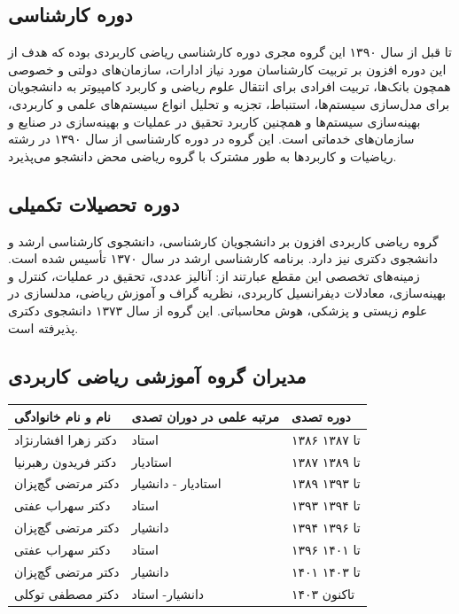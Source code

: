 \documentclass[
  letterpaper,
  DIV=11,
  numbers=noendperiod]{scrreprt}
\newcounter{none} %
\begin{document}
\subsection{دوره
کارشناسی}\label{ux62fux648ux631ux647-ux6a9ux627ux631ux634ux646ux627ux633ux6cc}

تا قبل از سال ۱۳۹۰ این گروه مجری دوره کارشناسی ریاضی کاربردی بوده که هدف
از این دوره افزون بر تربیت کارشناسان مورد نیاز ادارات، سازمان‌های دولتی و
خصوصی همچون بانک‌ها، تربیت افرادی برای انتقال علوم ریاضی و کاربرد
کامپیوتر به دانشجویان برای مدل‌سازی سیستم‌ها، استنباط، تجزیه و تحلیل انواع
سیستم‌های علمی و کاربردی، بهینه‌سازی سیستم‌ها و همچنین کاربرد تحقیق در
عملیات و بهینه‌سازی در صنایع و سازمان‌های خدماتی است. این گروه در دوره
کارشناسی از سال ۱۳۹۰ در رشته ریاضیات و کاربردها به طور مشترک با گروه
ریاضی محض دانشجو می‌پذیرد.

\subsection{دوره تحصیلات
تکمیلی}\label{ux62fux648ux631ux647-ux62aux62dux635ux6ccux644ux627ux62a-ux62aux6a9ux645ux6ccux644ux6cc}

گروه ریاضی کاربردی افزون بر دانشجویان کارشناسی، دانشجوی کارشناسی ارشد و
دانشجوی دکتری نیز دارد. برنامه کارشناسی ارشد در سال ۱۳۷۰ تأسیس شده است.
زمینه‌های تخصصی این مقطع عبارتند از: آنالیز عددی، تحقیق در عملیات، کنترل
و بهینه‌سازی، معادلات دیفرانسیل کاربردی، نظریه گراف و آموزش ریاضی،
مدلسازی در علوم زیستی و پزشکی، هوش محاسباتی. این گروه از سال ۱۳۷۳
دانشجوی دکتری پذیرفته است.

\subsection{مدیران گروه آموزشی ریاضی
کاربردی}\label{ux645ux62fux6ccux631ux627ux646-ux6afux631ux648ux647-ux622ux645ux648ux632ux634ux6cc-ux631ux6ccux627ux636ux6cc-ux6a9ux627ux631ux628ux631ux62fux6cc}

{\def\LTcaptype{none} %
\begin{longtable}[]{@{}lll@{}}
\toprule\noalign{}
نام و نام خانوادگی & مرتبه علمی در دوران تصدی & دوره تصدی \\
\midrule\noalign{}
\endhead
\bottomrule\noalign{}
\endlastfoot
دکتر زهرا افشارنژاد & استاد & ۱۳۸۶ تا ۱۳۸۷ \\
دکتر فریدون رهبرنیا & استادیار & ۱۳۸۷ تا ۱۳۸۹ \\
دکتر مرتضی گچ‌پزان & استادیار - دانشیار & ۱۳۸۹ تا ۱۳۹۳ \\
دکتر سهراب عفتی & استاد & ۱۳۹۳ تا ۱۳۹۴ \\
دکتر مرتضی گچ‌پزان & دانشیار & ۱۳۹۴ تا ۱۳۹۶ \\
دکتر سهراب عفتی & استاد & ۱۳۹۶ تا ۱۴۰۱ \\
دکتر مرتضی گچ‌پزان & دانشیار & ۱۴۰۱ تا ۱۴۰۳ \\
دکتر مصطفی توکلی & دانشیار- استاد & ۱۴۰۳ تاکنون \\
\end{longtable}
}
\end{document}
